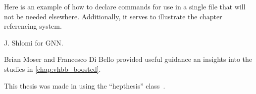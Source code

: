 Here is an example of how to declare commands for use in a single file that will not be needed elsewhere.
Additionally, it serves to illustrate the chapter referencing system.

J. Shlomi for GNN.

Brian Moser and Francesco Di Bello provided useful guidance an insights into the studies in \cref{chap:vhbb_boosted}.

This thesis was made in \LaTeXe{} using the ``hepthesis'' class~\cite{Buckley:2010:hepthesis}.